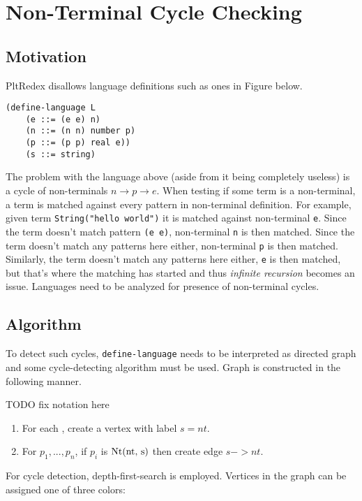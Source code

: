 \section{Non-Terminal Cycle Checking}

\subsection{Motivation}
PltRedex disallows language definitions such as ones in Figure below. 

\begin{lstlisting}
(define-language L
	(e ::= (e e) n)
	(n ::= (n n) number p)
	(p ::= (p p) real e))
	(s ::= string)
\end{lstlisting}

The problem with the language above (aside from it being completely useless) is a cycle of non-terminals $n \rightarrow p \rightarrow e$. When testing if some term is a non-terminal, a term is matched against every pattern in non-terminal definition. For example, given term \texttt{String("hello world")} it is matched against non-terminal \texttt{e}. Since  the term doesn't match pattern \texttt{(e e)}, non-terminal \texttt{n} is then matched. Since the term doesn't match any patterns here either, non-terminal \texttt{p} is then matched. Similarly, the term doesn't match any patterns here either, \texttt{e} is then matched, but that's where the matching has started and thus \textit{infinite recursion} becomes an issue. Languages need to be analyzed for presence of non-terminal cycles.

\subsection{Algorithm}
To detect such cycles, \texttt{define-language} needs to be interpreted as directed graph and some cycle-detecting algorithm must be used. Graph is constructed in the following manner.

TODO fix notation here

\begin{enumerate}
\item
For each \NtDefinition, create a vertex with label $s=nt$.
\item
For $p_1, ..., p_n$, if $p_i$ is $\Nt$ then create edge $s->nt$.
\end{enumerate}


For cycle detection, depth-first-search is employed. Vertices in the graph can be assigned one of three colors:


